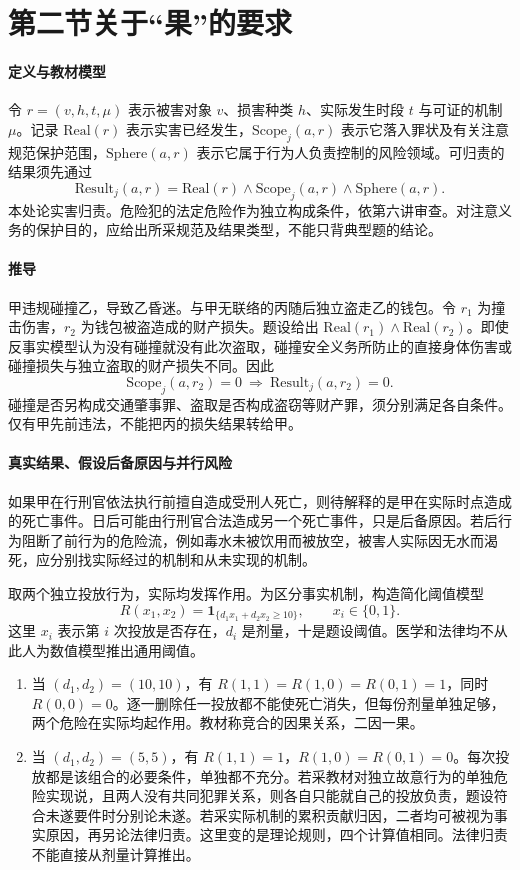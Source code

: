 \section{第二节\quad 关于“果”的要求}

\paragraph{定义与教材模型}
令 $r=(v,h,t,\mu)$ 表示被害对象 $v$、损害种类 $h$、实际发生时段 $t$ 与可证的机制 $\mu$。记录 $\mathrm{Real}(r)$ 表示实害已经发生，$\mathrm{Scope}_j(a,r)$ 表示它落入罪状及有关注意规范保护范围，$\mathrm{Sphere}(a,r)$ 表示它属于行为人负责控制的风险领域。可归责的结果须先通过
\[
\mathrm{Result}_j(a,r)
   =\mathrm{Real}(r)\land\mathrm{Scope}_j(a,r)
      \land\mathrm{Sphere}(a,r).
\]
本处论实害归责。危险犯的法定危险作为独立构成条件，依第六讲审查。对注意义务的保护目的，应给出所采规范及结果类型，不能只背典型题的结论。

\paragraph{推导}
甲违规碰撞乙，导致乙昏迷。与甲无联络的丙随后独立盗走乙的钱包。令 $r_1$ 为撞击伤害，$r_2$ 为钱包被盗造成的财产损失。题设给出 $\mathrm{Real}(r_1)\land\mathrm{Real}(r_2)$。即使反事实模型认为没有碰撞就没有此次盗取，碰撞安全义务所防止的直接身体伤害或碰撞损失与独立盗取的财产损失不同。因此
\[
\mathrm{Scope}_j(a,r_2)=0
  \ \Longrightarrow\ \mathrm{Result}_j(a,r_2)=0 .
\]
碰撞是否另构成交通肇事罪、盗取是否构成盗窃等财产罪，须分别满足各自条件。仅有甲先前违法，不能把丙的损失结果转给甲。

\paragraph{真实结果、假设后备原因与并行风险}
如果甲在行刑官依法执行前擅自造成受刑人死亡，则待解释的是甲在实际时点造成的死亡事件。日后可能由行刑官合法造成另一个死亡事件，只是后备原因。若后行为阻断了前行为的危险流，例如毒水未被饮用而被放空，被害人实际因无水而渴死，应分别找实际经过的机制和从未实现的机制。

取两个独立投放行为，实际均发挥作用。为区分事实机制，构造简化阈值模型
\[
R(x_1,x_2)=\mathbf{1}_{\{d_1x_1+d_2x_2\ge 10\}},
\qquad x_i\in\{0,1\}.
\]
这里 $x_i$ 表示第 $i$ 次投放是否存在，$d_i$ 是剂量，十是题设阈值。医学和法律均不从此人为数值模型推出通用阈值。

\begin{enumerate}
\item 当 $(d_1,d_2)=(10,10)$，有 $R(1,1)=R(1,0)=R(0,1)=1$，同时 $R(0,0)=0$。逐一删除任一投放都不能使死亡消失，但每份剂量单独足够，两个危险在实际均起作用。教材称竞合的因果关系，二因一果。
\item 当 $(d_1,d_2)=(5,5)$，有 $R(1,1)=1$，$R(1,0)=R(0,1)=0$。每次投放都是该组合的必要条件，单独都不充分。若采教材对独立故意行为的单独危险实现说，且两人没有共同犯罪关系，则各自只能就自己的投放负责，题设符合未遂要件时分别论未遂。若采实际机制的累积贡献归因，二者均可被视为事实原因，再另论法律归责。这里变的是理论规则，四个计算值相同。法律归责不能直接从剂量计算推出。
\end{enumerate}


